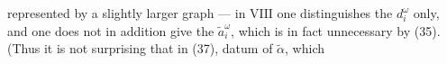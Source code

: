 represented by a slightly larger graph --- in $\boxed{\mathrm{VIII}}$ one distinguishes the   $d_i^\omega$ only, and one does not in addition give the $\widetilde a_i^\omega$, which is in fact unnecessary by (35). (Thus it is not surprising that in (37),  datum of $\widetilde\alpha$, which
